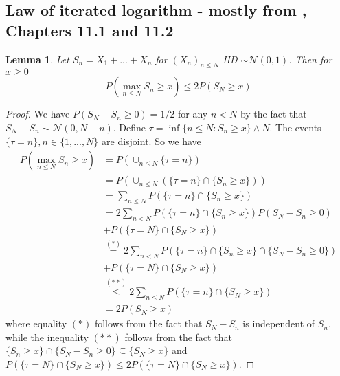 \documentclass{article}
\theoremstyle{plain}%
\newtheorem{lemma}[theorem]{Lemma}
\theoremstyle{definition}
\theoremstyle{remark}
\begin{document}
\subsection{Law of iterated logarithm - mostly from \cite{pollard2002user}, Chapters 11.1 and 11.2}

\begin{lemma} 
\label{gaussian_maximal_inequality}	
Let $S_n=X_1+...+X_n$ for $(X_n)_{n\leq N}$ IID $\sim \mathcal{N}(0,1)$. Then for $x\geq 0$
$${P(\max_{n\leq N}S_n\geq x)\leq  2P(S_N\geq x)}$$
\end{lemma}
\begin{proof} We have $P(S_N-S_n\geq 0)=1/2$ for any $n<N$ by the fact that $S_N-S_n\sim \mathcal{N}(0,N-n)$. Define $\tau=\inf\{n\leq N:S_n\geq x\}\wedge N$. The events $\{\tau=n\},n \in \{1,...,N\}$ are disjoint. So we have
$$\begin{aligned}P(\max_{n\leq N}S_n\geq x)&=P(\cup_{n\leq N}\{\tau=n\})\\
&= P(\cup_{n\leq N}(\{\tau=n\}\cap\{S_n\geq x\}))\\
&=\sum_{n\leq N}P(\{\tau=n\}\cap\{S_n\geq x\})\\
&=2\sum_{n< N}P(\{\tau=n\}\cap\{S_n\geq x\})P(S_N-S_n\geq 0)\\
&+P(\{\tau=N\}\cap\{S_N\geq x\})\\
&\stackrel{(*)}{=}2\sum_{n< N}P(\{\tau=n\}\cap\{S_n\geq x\}\cap\{S_N-S_n\geq 0\})\\
&+P(\{\tau=N\}\cap\{S_N\geq x\})\\
&\stackrel{(**)}{\leq} 2\sum_{n\leq N}P(\{\tau=n\}\cap\{S_N\geq x\})\\
&=2P(S_N\geq x)
\end{aligned}$$
where equality $(*)$ follows from the fact that $S_N-S_n$ is independent of $S_n$, while the inequality $(**)$ follows from the fact that $\{S_n\geq x\}\cap\{S_N-S_n\geq 0\}\subseteq \{S_N\geq x\}$ and $P(\{\tau=N\}\cap\{S_N\geq x\})\leq 2P(\{\tau=N\}\cap\{S_N\geq x\})$.
\end{proof}
\end{document}
